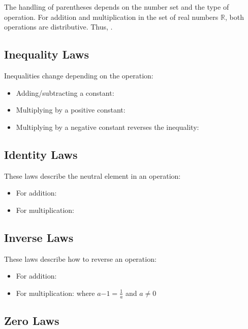 The handling of parentheses depends on the number set and the type of operation. For addition and multiplication in the set of real numbers $\mathbb{R}$, both operations are distributive. Thus, 
.

\subsection{Inequality Laws}\label{Inequality Laws}

Inequalities change depending on the operation:
\begin{itemize} \item Adding/subtracting a constant:  \item Multiplying by a positive constant:  \item Multiplying by a negative constant reverses the inequality:  \end{itemize}

\subsection{Identity Laws}\label{Identity Laws}

These laws describe the neutral element in an operation:
\begin{itemize} \item For addition:  \item For multiplication:  \end{itemize}

\subsection{Inverse Laws}\label{Inverse Laws}

These laws describe how to reverse an operation:
\begin{itemize} \item For addition:  \item For multiplication:  where 
$a{-1} = \frac{1}{a}$ and $a \neq 0$
\end{itemize}

\subsection{Zero Laws}\label{Zero Laws}

